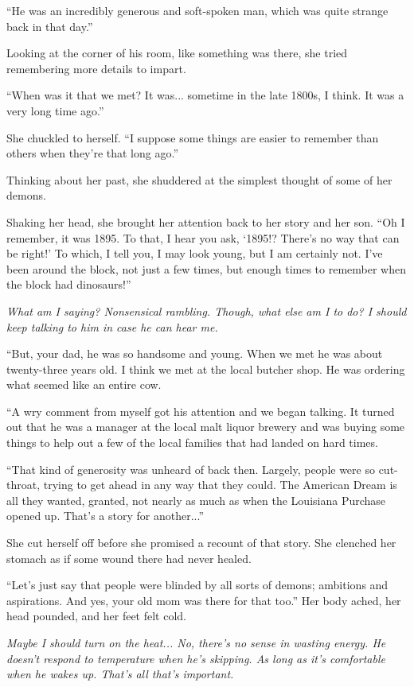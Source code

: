 ``He was an incredibly generous and soft-spoken man, which was quite strange back in that day.''

Looking at the corner of his room, like something was there, she tried remembering more details to impart.

``When was it that we met? It was... sometime in the late 1800s, I think. It was a very long time ago.''

She chuckled to herself. ``I suppose some things are easier to remember than others when they're that long ago.''

Thinking about her past, she shuddered at the simplest thought of some of her demons.

Shaking her head, she brought her attention back to her story and her son. ``Oh I remember, it was 1895. To that, I hear you ask, `1895!? There's no way that can be right!' To which, I tell you, I may look young, but I am certainly not. I've been around the block, not just a few times, but enough times to remember when the block had dinosaurs!''

\textit{What am I saying? Nonsensical rambling. Though, what else am I to do? I should keep talking to him in case he can hear me.}

``But, your dad, he was so handsome and young. When we met he was about twenty-three years old. I think we met at the local butcher shop. He was ordering what seemed like an entire cow.

``A wry comment from myself got his attention and we began talking. It turned out that he was a manager at the local malt liquor brewery and was buying some things to help out a few of the local families that had landed on hard times.

``That kind of generosity was unheard of back then. Largely, people were so cut-throat, trying to get ahead in any way that they could. The American Dream is all they wanted, granted, not nearly as much as when the Louisiana Purchase opened up. That's a story for another...''

She cut herself off before she promised a recount of that story. She clenched her stomach as if some wound there had never healed.

``Let's just say that people were blinded by all sorts of demons; ambitions and aspirations. And yes, your old mom was there for that too.'' Her body ached, her head pounded, and her feet felt cold.

\textit{Maybe I should turn on the heat... No, there's no sense in wasting energy. He doesn't respond to temperature when he's skipping. As long as it's comfortable when he wakes up. That's all that's important.}

